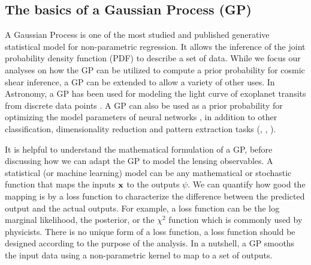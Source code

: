 \subsection{The basics of a Gaussian Process (GP)}
A Gaussian Process is one of the most studied and published 
generative statistical model for non-parametric regression. 
It allows the inference of the joint probability density 
function (PDF) to describe a set of data. 
While we focus our analyses on how the GP can be utilized to compute a prior
probability for cosmic shear inference, a GP can be extended to 
allow a variety of other uses. In Astronomy, a GP has been used for modeling 
the light curve of exoplanet transits from discrete data points
\citep{Ambikasaran2014a}. A GP can also be used as a prior probability for optimizing the 
model parameters of neural networks \citep{Snoek2012}, in addition to 
other classification, dimensionality reduction 
and pattern extraction tasks
(\citealt{Wilson2013}, \citealt{Duvenaud2013}, \citealt{Rasmussen2006}).
 
It is helpful to understand the mathematical formulation of a GP, 
before discussing how we can adapt the GP to model the lensing observables. 
A statistical (or machine learning) model can be any mathematical or stochastic
function that maps the inputs $\mathbf{x}$ to the outputs $\psi$. 
We can quantify how good the mapping is by a loss function to characterize the
difference between the
predicted output and the actual outputs. For example, a loss function can be the log
marginal likelihood, the posterior, or the
$\chi^2$ function which is commonly used by physicists. 
There is no unique form of a loss function, a loss function
should be designed according to the purpose of the analysis.
In a nutshell, a GP smooths the input data using a non-parametric kernel
\citep{Hastie1990} to map to a set of outputs. 

